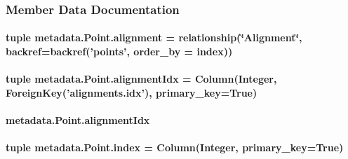 \subsubsection{Member Data Documentation}
\hypertarget{classmetadata_1_1Point_a3cbb7aebda686335a2f0cde52f0b24e2}{
\paragraph[{alignment}]{\setlength{\rightskip}{0pt plus 5cm}tuple metadata.\-Point.\-alignment = relationship(\char`\"{}Alignment\char`\"{}, backref=backref('points', order\-\_\-by = {\bf index}))\hspace{0.3cm}{\ttfamily [static]}}}\label{classmetadata_1_1Point_a3cbb7aebda686335a2f0cde52f0b24e2}
\hypertarget{classmetadata_1_1Point_aca84ced91bcd73942f9b18b228eb067d}{
\paragraph[{alignment\-Idx}]{\setlength{\rightskip}{0pt plus 5cm}tuple metadata.\-Point.\-alignment\-Idx = Column(Integer, Foreign\-Key('alignments.\-idx'), primary\-\_\-key=True)\hspace{0.3cm}{\ttfamily [static]}}}\label{classmetadata_1_1Point_aca84ced91bcd73942f9b18b228eb067d}
\hypertarget{classmetadata_1_1Point_ad295c4033b79c606357bb08faff0d8a2}{
\paragraph[{alignment\-Idx}]{\setlength{\rightskip}{0pt plus 5cm}metadata.\-Point.\-alignment\-Idx}}\label{classmetadata_1_1Point_ad295c4033b79c606357bb08faff0d8a2}
\hypertarget{classmetadata_1_1Point_a705698f68fdde0a27f3fc9787c35e363}{
\paragraph[{index}]{\setlength{\rightskip}{0pt plus 5cm}tuple metadata.\-Point.\-index = Column(Integer, primary\-\_\-key=True)\hspace{0.3cm}{\ttfamily [static]}}}\label{classmetadata_1_1Point_a705698f68fdde0a27f3fc9787c35e363}
